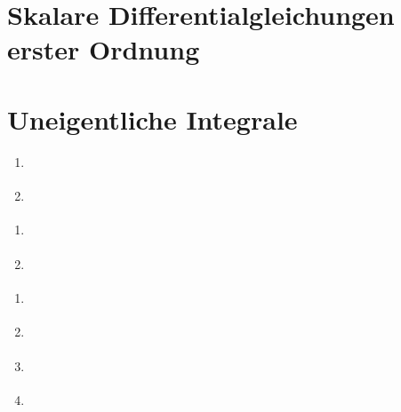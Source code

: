 \documentclass[12pt]{scrreprt}
\begin{document}


\section{Skalare Differentialgleichungen erster Ordnung}
\label{sec:skalare-dgl}

\begin{satz}
  \label{satz:int.tv}

\end{satz}

\begin{bsp}
  \label{bsp:int.tv}

\end{bsp}

\section{Uneigentliche Integrale}
\label{sec:int.uneigentl}

\begin{dfn}
  \label{dfn:int.uneigentl}

  \begin{enumerate}
    \item \label{dfn:int.uneigentl.a}
    \item \label{dfn:int.uneigentl.b}
  \end{enumerate}
\end{dfn}

\begin{bem}
  \label{bem:int.uneigentl}

  \begin{enumerate}
    \item \label{bem:int.uneigentl.a}
    \item \label{bem:int.uneigentl.b}
  \end{enumerate}
\end{bem}

\begin{bsp}
  \label{bsp:int.uneigentl}

  \begin{enumerate}
    \item \label{bsp:int.uneigentl.a}
    \item \label{bsp:int.uneigentl.b}
    \item \label{bsp:int.uneigentl.c}
    \item \label{bsp:int.uneigentl.d}
  \end{enumerate}
\end{bsp}
\end{document}
